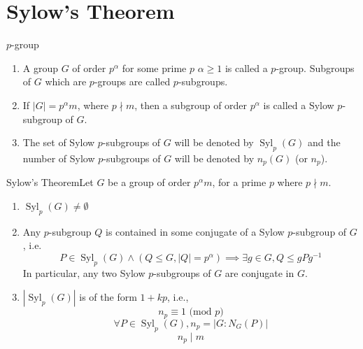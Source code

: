 \documentclass{report}
\newcommand{\thm}[2]{\begin{Theorem}{#1}{}#2\end{Theorem}}
\newcommand{\dfn}[2]{\begin{Definition}[colbacktitle=red!75!black]{#1}{}#2\end{Definition}}
\DeclareMathOperator{\Syl}{Syl}
\begin{document}
\section{Sylow's Theorem}
\dfn{$p$-group}{
\begin{enumerate}
    \item A group $G$ of order $p^\alpha$ for some prime $p$ $\alpha \geq 1$ is called a $p$-group. Subgroups of $G$ which are $p$-groups are called $p$-subgroups.
    \item If $|G| = p^\alpha m$, where $p \nmid m$, then a subgroup of order $p^\alpha$ is called a Sylow $p$-subgroup of $G$. 
    \item The set of Sylow $p$-subgroups of $G$ will be denoted by $\Syl_p(G)$ and the number of Sylow $p$-subgroups of $G$ will be denoted by $n_p(G)$ (or $n_p$). 
\end{enumerate}}
\thm{Sylow's Theorem}{Let $G$ be a group of order $p^\alpha m$, for a prime $p$ where $p \nmid m$. 
\begin{enumerate}
    \item $\Syl_p(G) \neq \emptyset$
    \item Any $p$-subgroup $Q$ is contained in some conjugate of a Sylow $p$-subgroup of $G$, i.e.
    $$P \in \Syl_p(G) \land (Q\leq G, |Q| = p^\alpha)\implies \exists g \in G, Q \leq gPg^{-1}$$
    In particular, any two Sylow $p$-subgroups of $G$ are conjugate in $G$. 
    \item $|\Syl_p(G)|$ is of the form $1 + kp$, i.e.,
    $$n_p \equiv 1 \text{ (mod } p)$$
    $$\forall P \in \Syl_p(G), n_p = |G:N_G(P)|$$
    $$n_p \mid m$$
\end{enumerate}}
\end{document}
